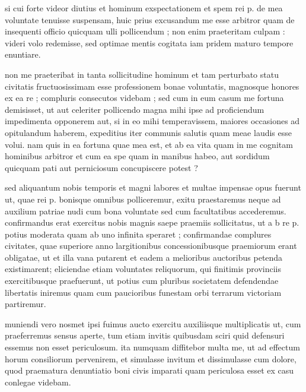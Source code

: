 


 si cui forte videor diutius et hominum exspectationem et spem rei p. de mea voluntate tenuisse suspensam, huic prius excusandum me esse arbitror quam de insequenti officio quicquam ulli pollicendum ; non enim praeteritam culpam : videri volo redemisse, sed optimae mentis cogitata iam pridem maturo tempore enuntiare.

 non me praeteribat in tanta sollicitudine hominum et tam perturbato statu civitatis fructuosissimam esse professionem bonae voluntatis, magnosque honores ex ea re ; compluris consecutos videbam ; sed cum in eum casum me fortuna demisisset, ut aut celeriter pollicendo magna mihi ipse ad proficiendum impedimenta opponerem aut, si in eo mihi temperavissem, maiores occasiones ad opitulandum haberem, expeditius iter communis salutis quam meae laudis esse volui. nam quis in ea fortuna quae mea est, et ab ea vita quam in me cognitam hominibus arbitror et cum ea spe quam in manibus habeo, aut sordidum quicquam pati aut perniciosum concupiscere potest ?

 sed aliquantum nobis temporis et magni labores et multae impensae opus fuerunt ut, quae rei p. bonisque omnibus polliceremur, exitu praestaremus neque ad auxilium patriae nudi cum bona voluntate sed cum facultatibus accederemus. confirmandus erat exercitus nobis magnis saepe praemiis sollicitatus, ut a b re p. potius moderata quam ab uno infinita speraret ; confirmandae complures civitates, quae superiore anno largitionibus concessionibusque praemiorum erant obligatae, ut et illa vana putarent et eadem a melioribus auctoribus petenda existimarent; eliciendae etiam voluntates reliquorum, qui finitimis provinciis exercitibusque praefuerunt, ut potius cum pluribus societatem defendendae libertatis iniremus quam cum paucioribus funestam orbi terrarum victoriam partiremur.

 muniendi vero nosmet ipsi fuimus aucto exercitu auxiliisque multiplicatis ut, cum praeferremus sensus aperte, tum etiam invitis quibusdam sciri quid defensuri essemus non esset periculosum. ita numquam diffitebor multa me, ut ad effectum horum consiliorum pervenirem, et simulasse invitum et dissimulasse cum dolore, quod praematura denuntiatio boni civis imparati quam periculosa esset ex casu conlegae videbam.

